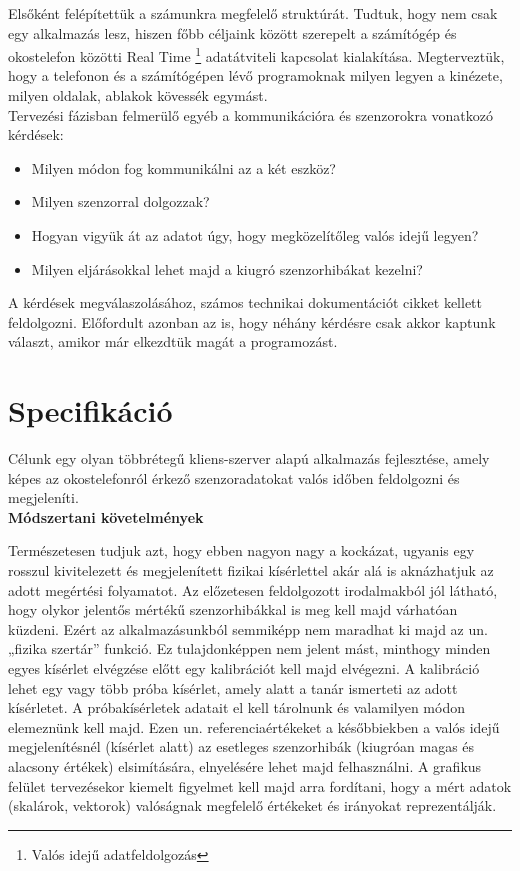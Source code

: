 \documentclass{thesis-ekf}
\theoremstyle{definition}
\theoremstyle{remark}
\begin{document}
\par Elsőként felépítettük a számunkra megfelelő struktúrát. Tudtuk, hogy nem csak egy alkalmazás lesz, hiszen főbb céljaink között szerepelt a számítógép és okostelefon közötti Real Time \footnote{Valós idejű adatfeldolgozás} adatátviteli kapcsolat kialakítása. Megterveztük, hogy a telefonon és a számítógépen lévő programoknak milyen legyen a kinézete, milyen oldalak, ablakok kövessék egymást.\\
Tervezési fázisban felmerülő egyéb a kommunikációra és szenzorokra vonatkozó kérdések:
\begin{itemize}
\item Milyen módon fog kommunikálni az a két eszköz? 
\item Milyen szenzorral dolgozzak? 
\item Hogyan vigyük át az adatot úgy, hogy megközelítőleg valós idejű legyen?
\item Milyen eljárásokkal lehet majd a kiugró szenzorhibákat kezelni?
\end{itemize}
\par  A kérdések megválaszolásához, számos technikai dokumentációt cikket kellett feldolgozni.
Előfordult azonban az is, hogy néhány kérdésre csak akkor kaptunk választ, amikor már elkezdtük magát a programozást.

\section{Specifikáció}

\par Célunk egy olyan többrétegű kliens-szerver alapú alkalmazás fejlesztése, amely képes az okostelefonról érkező szenzoradatokat valós időben feldolgozni és megjeleníti.\\

\noindent \textbf{Módszertani követelmények} 

\par Természetesen tudjuk azt, hogy ebben nagyon nagy a kockázat, ugyanis egy rosszul kivitelezett és megjelenített fizikai kísérlettel akár alá is aknázhatjuk az adott megértési folyamatot.  Az előzetesen feldolgozott irodalmakból jól látható, hogy olykor jelentős mértékű szenzorhibákkal is meg kell majd várhatóan küzdeni. Ezért az alkalmazásunkból semmiképp nem maradhat ki majd az un. „fizika szertár” funkció. Ez tulajdonképpen nem jelent mást, minthogy minden egyes kísérlet elvégzése előtt egy kalibrációt kell majd elvégezni. A kalibráció lehet egy vagy több próba kísérlet, amely alatt a tanár ismerteti az adott kísérletet. A próbakísérletek adatait el kell tárolnunk és valamilyen módon elemeznünk kell majd. Ezen un. referenciaértékeket a későbbiekben a valós idejű megjelenítésnél (kísérlet alatt) az esetleges szenzorhibák (kiugróan magas és alacsony értékek) elsimítására, elnyelésére lehet majd felhasználni. A grafikus felület tervezésekor kiemelt figyelmet kell majd arra fordítani, hogy a mért adatok (skalárok, vektorok) valóságnak megfelelő értékeket és irányokat reprezentálják.\\
\end{document}
